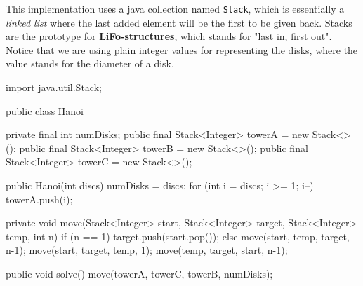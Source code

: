 \begin{impl}
This implementation uses a java collection named \texttt{Stack}, which is essentially a \emph{linked list} where the last added element will be the first to be given back. Stacks are the prototype for \textbf{LiFo-structures}, which stands for "last in, first out".
Notice that we are using plain integer values for representing the disks, where the value stands for the diameter of a disk.
\end{impl}

\begin{javacode}
import java.util.Stack;

public class Hanoi {
    private final int numDisks;
    public final Stack<Integer> towerA = new Stack<>();
    public final Stack<Integer> towerB = new Stack<>();
    public final Stack<Integer> towerC = new Stack<>();
    
    public Hanoi(int discs) {
        numDisks = discs;
        for (int i = discs; i >= 1; i--)
            towerA.push(i);
    }
    
    private void move(Stack<Integer> start, Stack<Integer> target, 
                      Stack<Integer> temp, int n) {
        if (n == 1) {
            target.push(start.pop());
        } else {
            move(start, temp, target, n-1);
            move(start, target, temp, 1);
            move(temp, target, start, n-1);
        }
    }
    
    public void solve() {
        move(towerA, towerC, towerB, numDisks);
    }
}
\end{javacode}
